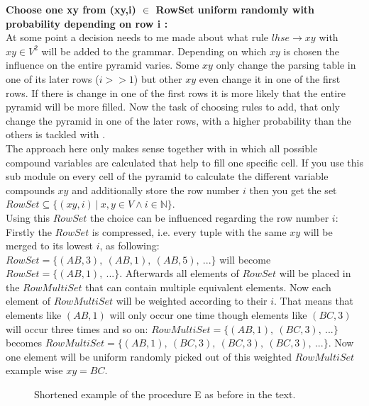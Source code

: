 \noindent \textbf{Choose one xy from (xy,i) $\in$ RowSet uniform randomly with probability depending on row i  :}\\
At some point a decision needs to me made about what rule $lhse\rightarrow xy$ with $xy \in V^2$ will be added to the grammar. Depending on which $xy$ is chosen the influence on the entire pyramid varies. Some $xy$ only change the parsing table in one of its later rows ($i>>1$) but other $xy$ even change it in one of the first rows. If there is change in one of the first rows it is more likely that the entire pyramid will be more filled. Now the task of choosing rules to add, that only change the pyramid in one of the later rows, with a higher probability than the others is tackled with . \\
The approach here only makes sense together with  in which all possible compound variables are calculated that help to fill one specific cell. If you use this sub module on every cell of the pyramid to calculate the different variable compounds $xy$ and additionally store the row number $i$ then you get the set $RowSet \subseteq \{(xy,i)\ |\ x,y \in V \wedge i \in \mathbb{N} \}$.\\ 
Using this $RowSet$ the choice can be influenced regarding the row number $i$:\\ Firstly the $RowSet$ is compressed, i.e. every tuple with the same $xy$ will be merged to its lowest $i$, as following: $RowSet = \{(AB,3),~(AB,1),~(AB,5),~... \}$ will become $RowSet = \{(AB,1),~... \}$. Afterwards all elements of $RowSet$ will be placed in the $RowMultiSet$ that  can contain multiple equivalent elements. Now each element of $RowMultiSet$ will be weighted according to their $i$. That means that elements like $(AB,1)$ will only occur one time though elements like $(BC,3)$ will occur three times and so on: $RowMultiSet = \{(AB,1),~(BC,3),~...\}$ becomes $RowMultiSet = \{(AB,1),~(BC,3),~(BC,3),~(BC,3),~...\}$. Now one element will be uniform randomly picked out of this weighted $RowMultiSet$ example wise $xy = BC$.\\

\noindent
\begin{figure} [h]
	\begin{minipage}{6in}
		\centering
	\end{minipage}
	\caption{Shortened example of the procedure E as before in the text.}
\end{figure}
\pagebreak
\clearpage
